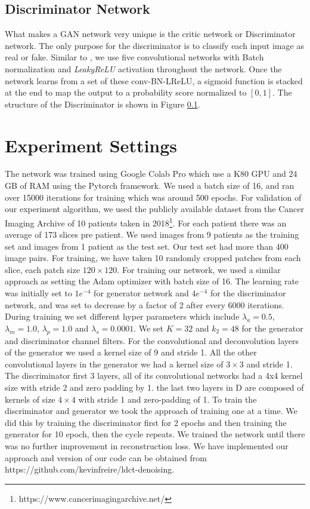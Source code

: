 \documentclass[journal]{IEEEtran}
\begin{document}
\subsection{Discriminator Network}
\label{discriminator}
	What makes a GAN network very unique is the critic network or Discriminator network.  The only purpose for the discriminator is to classify each input image as real or fake.  Similar to \cite{alsaiari2019image}, we use five convolutional networks with Batch normalization and \emph{LeakyReLU} activation throughout the network.  Once the network learns from a set of these conv-BN-LReLU, a sigmoid function is stacked at the end to map the output to a probability score normalized to $[0,1]$.  The structure of the Discriminator is shown in Figure \ref{discriminator}.

\section{Experiment Settings}
\label{experiment settings}
	The network was trained using Google Colab Pro which use a K80 GPU and 24 GB of RAM using the Pytorch framework. We used a batch size of 16,  and ran over 15000 iterations for training which was around 500 epochs.  For validation of our experiment algorithm, we used the publicly available dataset from the Cancer Imaging Archive of 10 patients taken in 2018\footnote{https://www.cancerimagingarchive.net/}.  For each patient there was an average of 173 slices pre patient.  We used images from 9 patients as the training set and images from 1 patient as the test set.  Our test set had more than 400 image pairs.  For training, we have taken 10 randomly cropped patches from each slice, each patch size $120 \times 120$.  For training our network, we used a similar approach as \cite{9474492} setting the Adam optimizer with batch size of 16.  The learning rate was initially set to $1e^{-4}$ for generator network and $4e^{-4}$ for the discriminator network, and was set to decrease by a factor of 2 after every 6000 iterations.  During training we set different hyper parameters which include $\lambda_a=0.5$, $\lambda_m=1.0$, $\lambda_p=1.0$ and $\lambda_s=0.0001$. We set $K=32$ and $k_2=48$ for the generator and discriminator channel filters.  For the convolutional and deconvolution layers of the generator we used a kernel size of 9 and stride 1.  All the other convolutional layers in the generator we had a kernel size of $3 \times 3$ and stride 1.   The discriminator first 3 layers, all of its convolutional networks had a 4x4 kernel size with stride 2 and zero padding by 1.  the last two layers in D are composed of kernels of size $4\times 4$ with stride 1 and zero-padding of 1. To train the discriminator and generator we took the approach of training one at a time.  We did this by training the discriminator first for 2 epochs and then training the generator for 10 epoch, then the cycle repeats.  We trained the network until there was no further improvement in reconstruction loss.  We have implemented our approach and version of our code can be obtained from https://github.com/kevinfreire/ldct-denoising.
\end{document}
